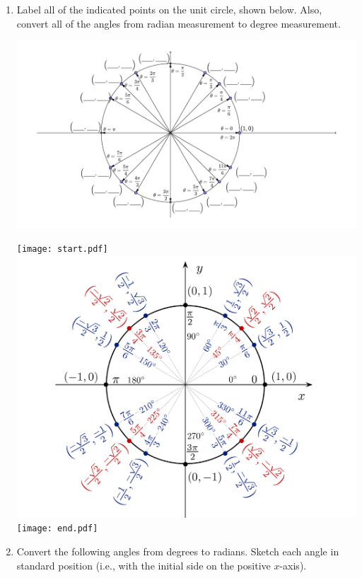 \documentclass[12pt]{article}
\begin{document}
\begin{enumerate}

\item Label all of the indicated points on the unit circle, shown below.  Also, convert all of the angles from radian measurement to degree measurement.

\begin{center}
\includegraphics[scale=0.8]{unitcircle4.pdf}
\end{center}

\texttt{[image: start.pdf]}
{{\includegraphics[scale=0.5]{unit_circle.pdf}}}
\texttt{[image: end.pdf]}



\item Convert the following angles from degrees to radians.  Sketch each angle in standard position (i.e., with the initial side on the positive $x$-axis).


\end{enumerate}
\end{document}
